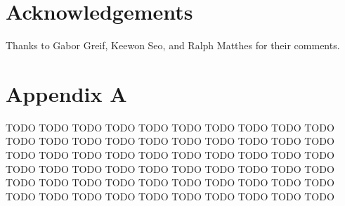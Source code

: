 \documentclass[a4paper,UKenglish]{lipics}
\begin{document}
\section*{Acknowledgements}
Thanks to Gabor Greif, Keewon Seo, and Ralph Matthes for their comments.






\newpage
\appendix
\section*{Appendix A}
TODO TODO TODO TODO TODO TODO TODO TODO TODO TODO TODO TODO
TODO TODO TODO TODO TODO TODO TODO TODO TODO TODO TODO TODO
TODO TODO TODO TODO TODO TODO TODO TODO TODO TODO TODO TODO
TODO TODO TODO TODO TODO TODO TODO TODO TODO TODO TODO TODO
TODO TODO TODO TODO TODO TODO TODO TODO TODO TODO TODO TODO


\end{document}
